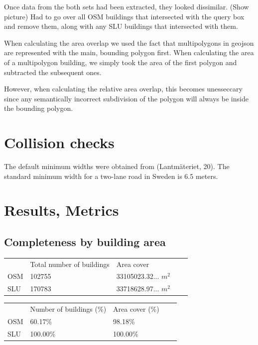 \documentclass[a4paper]{article}
\begin{document}
Once data from the both sets had been extracted, they looked dissimilar. (Show picture) Had to go over all OSM buildings that intersected with the query box and remove them, along with any SLU buildings that intersected with them.

When calculating the area overlap we used the fact that multipolygons in geojson are represented with the main, bounding polygon first. When calculating the area of a multipolygon building, we simply took the area of the first polygon and subtracted the subsequent ones.

However, when calculating the relative area overlap, this becomes unesseccary since any semantically incorrect subdivision of the polygon will always be inside the bounding polygon.

\section{Collision checks}

The default minimum widths were obtained from (Lantmäteriet, 20). The standard minimum width for a two-lane road in Sweden is 6.5 meters.

\section{Results, Metrics}

\subsection{Completeness by building area}

\begin{table}[H]
\begin{tabular}{lllll}
    & Total number of buildings & Area cover \\
    OSM & 102755 & 33105023.32... $m^2$ \\
    SLU & 170783 & 33718628.97... $m^2$
\end{tabular}
\end{table}

\begin{table}[H]
\begin{tabular}{lllll}
    & Number of buildings (\%) & Area cover (\%) \\
    OSM & 60.17\% & 98.18\% \\
    SLU & 100.00\% & 100.00\%
\end{tabular}
\end{table}
\end{document}
